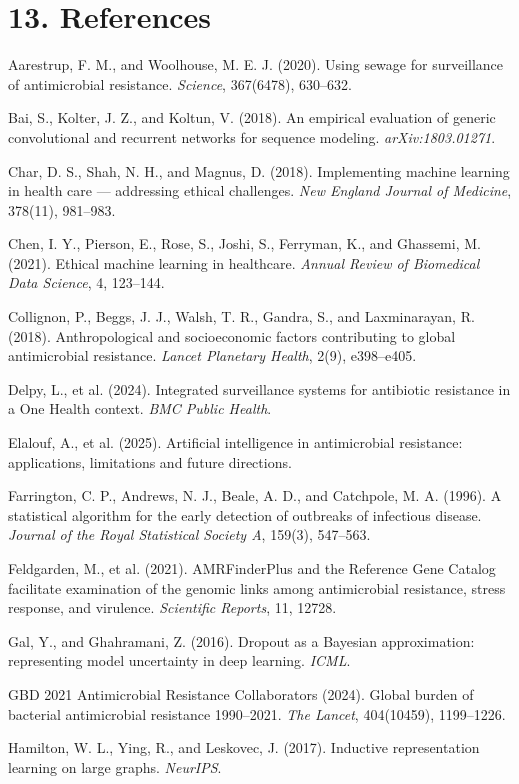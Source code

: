 \documentclass[11pt,a4paper]{article}
\begin{document}
\section*{13. References}

Aarestrup, F. M., and Woolhouse, M. E. J. (2020). Using sewage for surveillance of antimicrobial resistance. \emph{Science}, 367(6478), 630–632.

Bai, S., Kolter, J. Z., and Koltun, V. (2018). An empirical evaluation of generic convolutional and recurrent networks for sequence modeling. \emph{arXiv:1803.01271}.

Char, D. S., Shah, N. H., and Magnus, D. (2018). Implementing machine learning in health care — addressing ethical challenges. \emph{New England Journal of Medicine}, 378(11), 981–983.

Chen, I. Y., Pierson, E., Rose, S., Joshi, S., Ferryman, K., and Ghassemi, M. (2021). Ethical machine learning in healthcare. \emph{Annual Review of Biomedical Data Science}, 4, 123–144.

Collignon, P., Beggs, J. J., Walsh, T. R., Gandra, S., and Laxminarayan, R. (2018). Anthropological and socioeconomic factors contributing to global antimicrobial resistance. \emph{Lancet Planetary Health}, 2(9), e398–e405.

Delpy, L., et al. (2024). Integrated surveillance systems for antibiotic resistance in a One Health context. \emph{BMC Public Health}.

Elalouf, A., et al. (2025). Artificial intelligence in antimicrobial resistance: applications, limitations and future directions.

Farrington, C. P., Andrews, N. J., Beale, A. D., and Catchpole, M. A. (1996). A statistical algorithm for the early detection of outbreaks of infectious disease. \emph{Journal of the Royal Statistical Society A}, 159(3), 547–563.

Feldgarden, M., et al. (2021). AMRFinderPlus and the Reference Gene Catalog facilitate examination of the genomic links among antimicrobial resistance, stress response, and virulence. \emph{Scientific Reports}, 11, 12728.

Gal, Y., and Ghahramani, Z. (2016). Dropout as a Bayesian approximation: representing model uncertainty in deep learning. \emph{ICML}.

GBD 2021 Antimicrobial Resistance Collaborators (2024). Global burden of bacterial antimicrobial resistance 1990–2021. \emph{The Lancet}, 404(10459), 1199–1226.

Hamilton, W. L., Ying, R., and Leskovec, J. (2017). Inductive representation learning on large graphs. \emph{NeurIPS}.
\end{document}
